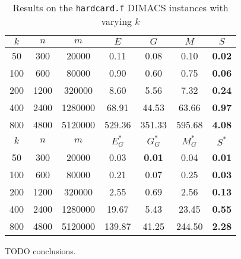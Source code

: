 \begin{table}
\centering
\begin{tabular}{
ccc|cccc}
$k$ & $n$ & $m$ & $E$ & $G$ & $M$ & $S$ \\
\hline
50 & 300 & 20000 & 0.11 & 0.08 & 0.10 & \textbf{0.02} \\
100 & 600 & 80000 & 0.90 & 0.60 & 0.75 & \textbf{0.06} \\
200 & 1200 & 320000 & 8.60 & 5.56 & 7.32 & \textbf{0.24} \\
400 & 2400 & 1280000 & 68.91 & 44.53 & 63.66 & \textbf{0.97} \\
800 & 4800 & 5120000 & 529.36 & 351.33 & 595.68 & \textbf{4.08} \\
\hline
$k$ & $n$ & $m$ & $E^*_G$ & $G^*_G$ & $M^*_G$ & $S^*$ \\
\hline
50 & 300 & 20000 & 0.03 & \textbf{0.01} & 0.04 & \textbf{0.01} \\
100 & 600 & 80000 & 0.21 & 0.07 & 0.25 & \textbf{0.03} \\
200 & 1200 & 320000 & 2.55 & 0.69 & 2.56 & \textbf{0.13} \\
400 & 2400 & 1280000 & 19.67 & 5.43 & 23.45 & \textbf{0.55} \\
800 & 4800 & 5120000 & 139.87 & 41.25 & 244.50 & \textbf{2.28} \\
\end{tabular}
\caption{Results on the \texttt{hardcard.f} DIMACS instances with varying $k$}\label{tab:hardcard}
\end{table}

TODO conclusions.